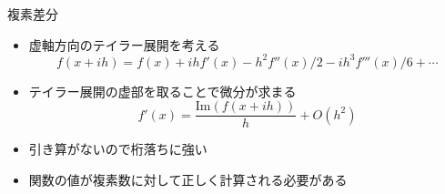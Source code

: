 \begin{frame}[t,fragile]{複素差分}
  \begin{itemize}
  \item 虚軸方向のテイラー展開を考える
    \[
    f(x+ih) = f(x) + ihf'(x) - h^2 f''(x)/2  - ih^3 f'''(x)/6 + \cdots
    \]
  \item テイラー展開の虚部を取ることで微分が求まる
    \[
    f'(x) = \frac{\mathrm{Im} (f(x+ih))}{h} + O(h^2)
    \]
  \item 引き算がないので桁落ちに強い
  \item 関数の値が複素数に対して正しく計算される必要がある
  \end{itemize}
\end{frame}
